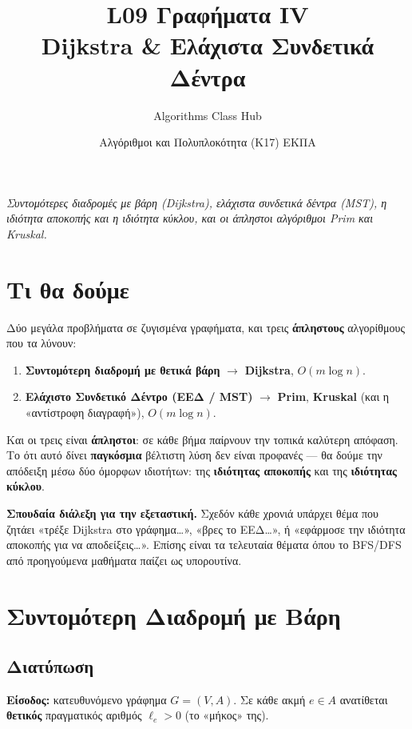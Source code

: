 \documentclass[11pt,a4paper]{article}
\title{\textbf{L09 \textperiodcentered{} Γραφήματα IV}\\[2pt]
\large Dijkstra \& Ελάχιστα Συνδετικά Δέντρα}
\author{Algorithms Class Hub}
\date{\small Αλγόριθμοι και Πολυπλοκότητα (K17) \textperiodcentered{} ΕΚΠΑ}
\begin{document}
\maketitle

\begin{center}\itshape\small
Συντομότερες διαδρομές με βάρη (Dijkstra), ελάχιστα συνδετικά δέντρα (MST), η
ιδιότητα αποκοπής και η ιδιότητα κύκλου, και οι άπληστοι αλγόριθμοι Prim και
Kruskal.
\end{center}

\section{Τι θα δούμε}

Δύο μεγάλα προβλήματα σε ζυγισμένα γραφήματα, και τρεις \textbf{άπληστους}
αλγορίθμους που τα λύνουν:
\begin{enumerate}
  \item \textbf{Συντομότερη διαδρομή με θετικά βάρη} $\to$ \textbf{Dijkstra},
  $O(m \log n)$.
  \item \textbf{Ελάχιστο Συνδετικό Δέντρο (ΕΕΔ / MST)} $\to$ \textbf{Prim},
  \textbf{Kruskal} (και η «αντίστροφη διαγραφή»), $O(m \log n)$.
\end{enumerate}

Και οι τρεις είναι \textbf{άπληστοι}: σε κάθε βήμα παίρνουν την τοπικά καλύτερη
απόφαση. Το ότι αυτό δίνει \textbf{παγκόσμια} βέλτιστη λύση δεν είναι προφανές
--- θα δούμε την απόδειξη μέσω δύο όμορφων ιδιοτήτων: της \textbf{ιδιότητας
αποκοπής} και της \textbf{ιδιότητας κύκλου}.

\begin{keypoint}
\textbf{Σπουδαία διάλεξη για την εξεταστική.} Σχεδόν κάθε χρονιά υπάρχει θέμα που
ζητάει «τρέξε Dijkstra στο γράφημα\dots», «βρες το ΕΕΔ\dots», ή «εφάρμοσε την
ιδιότητα αποκοπής για να αποδείξεις\dots». Επίσης είναι τα τελευταία θέματα όπου
το BFS/DFS από προηγούμενα μαθήματα παίζει ως υπορουτίνα.
\end{keypoint}

\section{Συντομότερη Διαδρομή με Βάρη}

\subsection{Διατύπωση}

\textbf{Είσοδος:} κατευθυνόμενο γράφημα $G = (V, A)$. Σε κάθε ακμή $e \in A$
ανατίθεται \textbf{θετικός} πραγματικός αριθμός $\ell_e > 0$ (το «μήκος» της).
\end{document}

